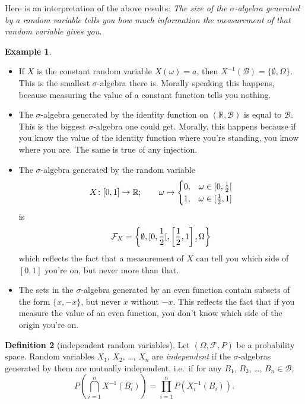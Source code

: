 \documentclass[a4paper,12pt]{scrreprt}
\newcommand{\R}{\mathbb{R}}
\theoremstyle{definition}
\newtheorem{definition}{Definition}
\newtheorem{example}[definition]{Example}
\theoremstyle{plain}
\theoremstyle{remark}
\begin{document}
Here is an interpretation of the above results: \emph{The size of the $\sigma$-algebra generated by a random variable tells you how much information the measurement of that random variable gives you.}
\begin{example}
  $\,$
  \begin{itemize}
    \item If $X$ is the constant random variable $X(\omega) = a$, then $X^{-1}(\mathcal{B}) = \{\emptyset, \Omega\}$. This is the smallest $\sigma$-algebra there is. Morally speaking this happens, because measuring the value of a constant function tells you nothing.

    \item The $\sigma$-algebra generated by the identity function on $(\R, \mathcal{B})$ is equal to $\mathcal{B}$. This is the biggest $\sigma$-algebra one could get. Morally, this happens because if you know the value of the identity function where you're standing, you know where you are. The same is true of any injection.

    \item The $\sigma$-algebra generated by the random variable
      \begin{equation*}
        X\colon [0, 1] \to \R;\qquad \omega \mapsto
        \begin{cases}
          0, &\omega \in \interval[open right]{0}{\frac{1}{2}} \\
          1, &\omega \in \interval{\frac{1}{2}}{1}
        \end{cases}
      \end{equation*}
      is
      \begin{equation*}
        \mathcal{F}_{X} = \left\{ \emptyset, \interval[open right]{0}{\frac{1}{2}}, \left[ \frac{1}{2}, 1 \right], \Omega \right\}
      \end{equation*}
      which reflects the fact that a measurement of $X$ can tell you which side of $[0, 1]$ you're on, but never more than that.

    \item The sets in the $\sigma$-algebra generated by an even function contain subsets of the form $\{x, -x\}$, but never $x$ without $-x$. This reflects the fact that if you measure the value of an even function, you don't know which side of the origin you're on.
  \end{itemize}
\end{example}

\begin{definition}[independent random variables]
  \label{def:independentrandomvariables}
  Let $(\Omega, \mathcal{F}, P)$ be a probability space. Random variables $X_{1}$, $X_{2}$, \ldots, $X_{n}$ are \emph{independent} if the $\sigma$-algebras generated by them are mutually independent, i.e.\ if for any $B_{1}$, $B_{2}$, \ldots, $B_{n} \in \mathcal{B}$,
  \begin{equation*}
    P\left( \bigcap_{i = 1}^{n} X^{-1}(B_{i}) \right) = \prod_{i = 1}^{n} P(X_{i}^{-1}(B_{i})).
  \end{equation*}
\end{definition}
\end{document}
